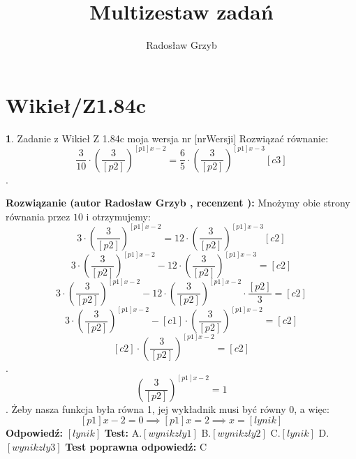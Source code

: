 \documentclass[12pt, a4paper]{article}
\title{Multizestaw zadań}
\author{Radosław Grzyb}
\date{}
\theoremstyle{definition} %
\newtheorem{zad}{}
\newcommand{\kategoria}[1]{\section{#1}} %
\newcommand{\zadStart}[1]{\begin{zad}#1\newline} %
\newcommand{\zadStop}{\end{zad}}   %
\newcommand{\rozwStart}[2]{\noindent \textbf{Rozwiązanie (autor #1 , recenzent #2): }\newline} %
\newcommand{\rozwStop}{\newline}                                            %
\newcommand{\odpStart}{\noindent \textbf{Odpowiedź:}\newline}    %
\newcommand{\odpStop}{\newline}                                             %
\newcommand{\testStart}{\noindent \textbf{Test:}\newline} %
\newcommand{\testStop}{\newline} %
\newcommand{\kluczStart}{\noindent \textbf{Test poprawna odpowiedź:}\newline} %
\newcommand{\kluczStop}{\newline} %
\begin{document}
\maketitle
\kategoria{Wikieł/Z1.84c}
\zadStart{Zadanie z Wikieł Z 1.84c moja wersja nr [nrWersji]}
Rozwiązać równanie:
$$\frac{3}{10}\cdot\left(\frac{3}{[p2]}\right)^{[p1]x-2}=\frac{6}{5}\cdot\left(\frac{3}{[p2]}\right)^{[p1]x-3}[c3]$$.
\zadStop
\rozwStart{Radosław Grzyb}{}
Mnożymy obie strony równania przez $10$ i otrzymujemy:\\
$$3\cdot\left(\frac{3}{[p2]}\right)^{[p1]x-2}=12\cdot\left(\frac{3}{[p2]}\right)^{[p1]x-3}[c2]$$
$$3\cdot\left(\frac{3}{[p2]}\right)^{[p1]x-2}-12\cdot\left(\frac{3}{[p2]}\right)^{[p1]x-3}=[c2]$$
$$3\cdot\left(\frac{3}{[p2]}\right)^{[p1]x-2}-12\cdot\left(\frac{3}{[p2]}\right)^{[p1]x-2}\cdot\frac{[p2]}{3}=[c2]$$
$$3\cdot\left(\frac{3}{[p2]}\right)^{[p1]x-2}-[c1]\cdot\left(\frac{3}{[p2]}\right)^{[p1]x-2}=[c2]$$
$$[c2]\cdot\left(\frac{3}{[p2]}\right)^{[p1]x-2}=[c2]$$.
$$\left(\frac{3}{[p2]}\right)^{[p1]x-2}=1$$.
Żeby nasza funkcja była równa 1, jej wykładnik musi być równy 0, a więc:\\
$$[p1]x-2=0\implies [p1]x=2\implies x=[lynik]$$
\rozwStop
\odpStart
$[lynik]$
\odpStop
\testStart
A.$[wynikzly1]$
B.$[wynikzly2]$
C.$[lynik]$
D.$[wynikzly3]$
\testStop
\kluczStart
C
\kluczStop
\end{document}
